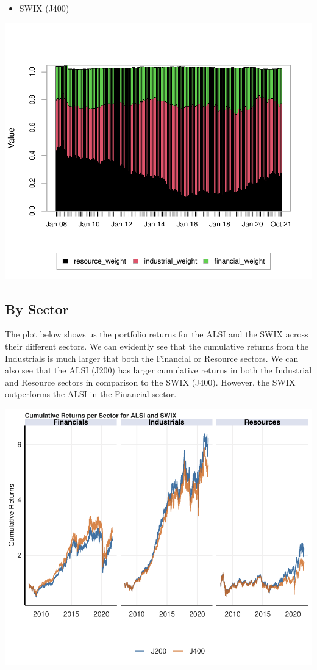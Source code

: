 \documentclass[11pt,preprint, authoryear]{elsarticle}
\numberwithin{equation}{section}
\numberwithin{figure}{section}
\numberwithin{table}{section}
\def\tightlist{} %
\begin{document}
\begin{itemize}
\tightlist
\item
  SWIX (J400)
\end{itemize}

\includegraphics{Question3_files/figure-latex/unnamed-chunk-6-1.pdf}

\hypertarget{by-sector}{%
\subsection{By Sector}\label{by-sector}}

The plot below shows us the portfolio returns for the ALSI and the SWIX
across their different sectors. We can evidently see that the cumulative
returns from the Industrials is much larger that both the Financial or
Resource sectors. We can also see that the ALSI (J200) has larger
cumulative returns in both the Industrial and Resource sectors in
comparison to the SWIX (J400). However, the SWIX outperforms the ALSI in
the Financial sector.

\includegraphics{Question3_files/figure-latex/unnamed-chunk-8-1.pdf}
\end{document}
